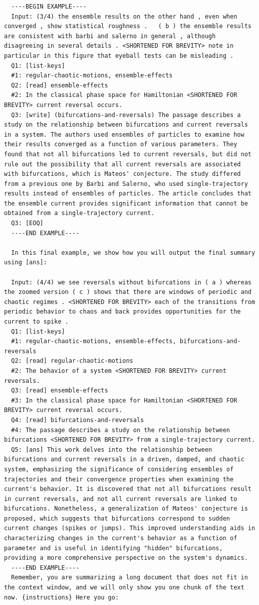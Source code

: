 \documentclass{article}
\begin{document}
\begin{lstlisting}
  ----BEGIN EXAMPLE----
  Input: (3/4) the ensemble results on the other hand , even when converged , show statistical roughness .   ( b ) the ensemble results are consistent with barbi and salerno in general , although disagreeing in several details . <SHORTENED FOR BREVITY> note in particular in this figure that eyeball tests can be misleading .
  Q1: [list-keys]
  #1: regular-chaotic-motions, ensemble-effects
  Q2: [read] ensemble-effects
  #2: In the classical phase space for Hamiltonian <SHORTENED FOR BREVITY> current reversal occurs.
  Q3: [write] (bifurcations-and-reversals) The passage describes a study on the relationship between bifurcations and current reversals in a system. The authors used ensembles of particles to examine how their results converged as a function of various parameters. They found that not all bifurcations led to current reversals, but did not rule out the possibility that all current reversals are associated with bifurcations, which is Mateos' conjecture. The study differed from a previous one by Barbi and Salerno, who used single-trajectory results instead of ensembles of particles. The article concludes that the ensemble current provides significant information that cannot be obtained from a single-trajectory current.
  Q3: [EOQ]
  ----END EXAMPLE----

  In this final example, we show how you will output the final summary using [ans]:

  Input: (4/4) we see reversals without bifurcations in ( a ) whereas the zoomed version ( c ) shows that there are windows of periodic and chaotic regimes . <SHORTENED FOR BREVITY> each of the transitions from periodic behavior to chaos and back provides opportunities for the current to spike .
  Q1: [list-keys]
  #1: regular-chaotic-motions, ensemble-effects, bifurcations-and-reversals
  Q2: [read] regular-chaotic-motions
  #2: The behavior of a system <SHORTENED FOR BREVITY> current reversals.
  Q3: [read] ensemble-effects
  #3: In the classical phase space for Hamiltonian <SHORTENED FOR BREVITY> current reversal occurs.
  Q4: [read] bifurcations-and-reversals
  #4: The passage describes a study on the relationship between bifurcations <SHORTENED FOR BREVITY> from a single-trajectory current.
  Q5: [ans] This work delves into the relationship between bifurcations and current reversals in a driven, damped, and chaotic system, emphasizing the significance of considering ensembles of trajectories and their convergence properties when examining the current's behavior. It is discovered that not all bifurcations result in current reversals, and not all current reversals are linked to bifurcations. Nonetheless, a generalization of Mateos' conjecture is proposed, which suggests that bifurcations correspond to sudden current changes (spikes or jumps). This improved understanding aids in characterizing changes in the current's behavior as a function of parameter and is useful in identifying "hidden" bifurcations, providing a more comprehensive perspective on the system's dynamics.
  ----END EXAMPLE----
  Remember, you are summarizing a long document that does not fit in the context window, and we will only show you one chunk of the text now. {instructions} Here you go:


\end{lstlisting}
\end{document}
